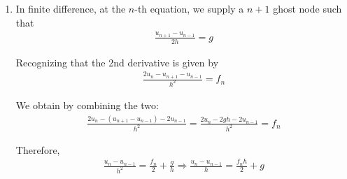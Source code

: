 \begin{enumerate}[label=(\alph*),leftmargin=*,itemsep=0mm]
    \item In finite difference, at the $n$-th equation, we supply a $n+1$ ghost node such that
    \begin{align*}
        \frac{u_{n+1} - u_{n-1}}{2h} = g
    \end{align*}
    
    Recognizing that the 2nd derivative is given by
    \begin{align*}
        \frac{2u_n-u_{n+1}-u_{n-1}}{h^2} = f_n
    \end{align*}
    
    We obtain by combining the two:
    \begin{align*}
        \frac{2u_n-(u_{n+1}-u_{n-1})-2u_{n-1}}{h^2} = \frac{2u_n-2gh-2u_{n-1}}{h^2} = f_n
    \end{align*}
    
    Therefore,
    \begin{align*}
        \frac{u_n-u_{n-1}}{h^2} = \frac{f_n}{2} + \frac{g}{h} \Rightarrow \frac{u_n-u_{n-1}}{h} = \frac{f_nh}{2} + g
    \end{align*}
    
\end{enumerate}